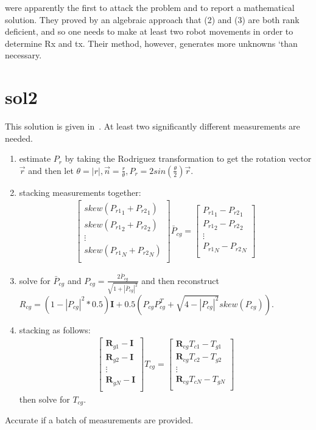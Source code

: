 \cite{shiu1989calibration} were apparently the
first to attack the problem and to report a mathematical
solution. They proved by an algebraic approach that (2)
and (3) are both rank deficient, and so one needs to
make at least two robot movements in order to
determine Rx and tx. Their method, however,
generates more unknowns ‘than necessary. 

\section{sol2}
This solution is given in~\cite{tsai1989new}. At least two significantly different measurements are needed.
\begin{enumerate}
\item estimate $P_r$ by taking the Rodriguez transformation to get the rotation vector $\vec{r}$ and then let $\theta=|r|, \vec{n}=\frac{r}{\theta}, P_r=2sin(\frac{\theta}{2})\vec{r}$.
\item stacking measurements together:
	\begin{align*}
		\left[
		\begin{matrix}
			skew({P_{r1}}_1+{P_{r2}}_1) \\
			skew({P_{r1}}_2+{P_{r2}}_2) \\
			\vdots \\
			skew({P_{r1}}_N+{P_{r2}}_N) \\
		\end{matrix}
		\right]\bar{P}_{cg} = \left[
		\begin{matrix}
		{P_{r1}}_1-{P_{r2}}_1 \\
		{P_{r1}}_2-{P_{r2}}_2 \\
		\vdots \\
		{P_{r1}}_N-{P_{r2}}_N \\
		\end{matrix}
		\right]
	\end{align*}
\item solve for $\bar{P}_{cg}$ and $P_{cg}=\frac{2\bar{P}_{cg}}{\sqrt{1+|\bar{P}_{cg}|^2}}$ and then reconstruct $R_{cg}=(1-|P_{cg}|^2*0.5)\mathbf{I}+0.5(P_{cg}P_{cg}^T+\sqrt{4-|P_{cg}|^2}skew(P_{cg}))$.
\item stacking as follows:
	\begin{align*}
		\left[
		\begin{matrix}
			\mathbf{R}_{g1}-\mathbf{I} \\
			\mathbf{R}_{g2}-\mathbf{I} \\
			\vdots \\
			\mathbf{R}_{gN}-\mathbf{I} \\
		\end{matrix}
		\right]{T}_{cg} = \left[
		\begin{matrix}
		\mathbf{R}_{cg}T_{c1}-T_{g1} \\ 
		\mathbf{R}_{cg}T_{c2}-T_{g2} \\ 
		\vdots \\
		\mathbf{R}_{cg}T_{cN}-T_{gN} \\ 
		\end{matrix}
		\right]
	\end{align*}
	then solve for $T_{cg}$.
\end{enumerate}
Accurate if a batch of measurements are provided.


